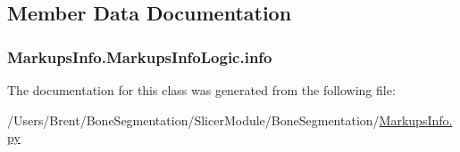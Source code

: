 \subsection{Member Data Documentation}
\hypertarget{class_markups_info_1_1_markups_info_logic_a6686b8ed0153b4d5c210ae7bfa1a174e}{}
\subsubsection[{info}]{\setlength{\rightskip}{0pt plus 5cm}Markups\+Info.\+Markups\+Info\+Logic.\+info}\label{class_markups_info_1_1_markups_info_logic_a6686b8ed0153b4d5c210ae7bfa1a174e}


The documentation for this class was generated from the following file\+:\begin{DoxyCompactItemize}
\item 
/\+Users/\+Brent/\+Bone\+Segmentation/\+Slicer\+Module/\+Bone\+Segmentation/\hyperlink{_markups_info_8py}{Markups\+Info.\+py}\end{DoxyCompactItemize}
